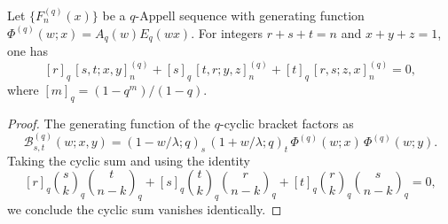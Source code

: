 \documentclass[10pt,a4paper]{amsart}
\begin{document}
\begin{theorem}
Let $\{F_n^{(q)}(x)\}$ be a $q$-Appell sequence with generating function
$\Phi^{(q)}(w;x)=A_q(w)E_q(wx)$. For integers $r+s+t=n$ and $x+y+z=1$, one has
\[
[r]_q\,[s,t;x,y]_n^{(q)} +
[s]_q\,[t,r;y,z]_n^{(q)} +
[t]_q\,[r,s;z,x]_n^{(q)} = 0,
\]
where $[m]_q=(1-q^m)/(1-q)$.
\end{theorem}

\begin{proof}
The generating function of the $q$-cyclic bracket factors as
\[
\mathcal{B}^{(q)}_{s,t}(w;x,y)
=(1-w/\lambda;q)_s\,(1+w/\lambda;q)_t\,
\Phi^{(q)}(w;x)\,\Phi^{(q)}(w;y).
\]
Taking the cyclic sum and using the identity
\[
[r]_q\binom{s}{k}_q\binom{t}{n-k}_q
+[s]_q\binom{t}{k}_q\binom{r}{n-k}_q
+[t]_q\binom{r}{k}_q\binom{s}{n-k}_q=0,
\]
we conclude the cyclic sum vanishes identically.
\end{proof}
\end{document}
